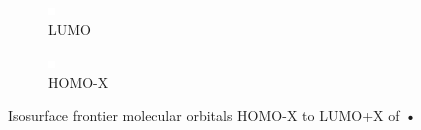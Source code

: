 \begin{figure}[!ht]
\begin{subfigure}[b]{0.33\textwidth}
  \includegraphics[clip=true, width=\textwidth, keepaspectratio]{images/insertgraphic.eps}
  \caption{LUMO}
 \end{subfigure}
 \begin{subfigure}[b]{0.33\textwidth}
  \includegraphics[clip=true, width=\textwidth, keepaspectratio]{images/insertgraphic.eps}
  \caption{HOMO-X}
 \end{subfigure}
\caption[Molecular orbitals HOMO-X to LUMO+X of \textbf{•}]{Isosurface frontier molecular orbitals HOMO-X to LUMO+X of \textbf{•}}
\end{figure} 


